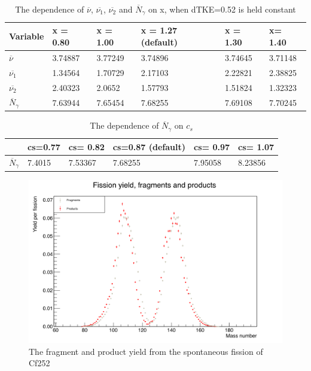 \documentclass[]{article}
\begin{document}
\begin{table} [H]
	\centering
	\caption{The dependence of $\overline{\nu}$, $\overline{\nu_1}$, $\overline{\nu_2}$ and $\overline{N}_{\gamma}$ on x, when dTKE=0.52 is held constant}
	\begin{tabularx}{\textwidth}{XXXXXX} \hline
		\label{tab:dependence_on_x}
		Variable & x = 0.80 & x  = 1.00 & x = 1.27 (default) & x = 1.30 & x= 1.40\\ \hline
		$\overline{\nu}$ & 3.74887 & 3.77249 & 3.74896 & 3.74645 & 3.71148\\
		$\overline{\nu_1}$ & 1.34564 & 1.70729  & 2.17103 & 2.22821 & 2.38825 \\
		$\overline{\nu_2}$ & 2.40323  & 2.0652 & 1.57793 & 1.51824 & 1.32323 \\ 
		$\overline{N}_{\gamma}$ & 7.63944 & 7.65454 & 7.68255 & 7.69108 & 7.70245\\
		\hline
	\end{tabularx}
\end{table}

\begin{table} [H]
	\centering
	\caption{The dependence of  $\overline{N}_{\gamma}$ on $c_s$}
	\begin{tabularx}{\textwidth}{XXXXXX} \hline
		\label{tab:dependence_on_c}
		 & cs=0.77 & cs= 0.82 & cs=0.87 (default) & cs= 0.97 & cs= 1.07 \\ \hline
		$\overline{N}_{\gamma}$ & 7.4015 & 7.53367 & 7.68255 & 7.95058 & 8.23856 \\
		\hline
	\end{tabularx}
\end{table}

\begin{figure} [H]
	\centering
	\includegraphics[scale=0.37]{Cf252_sf_fragment_product_yield.png}
	\caption{The fragment and product yield from the spontaneous fission of Cf252}
	\label{fig:Cf252_sf_fragment_product_yield}
\end{figure}
\end{document}
